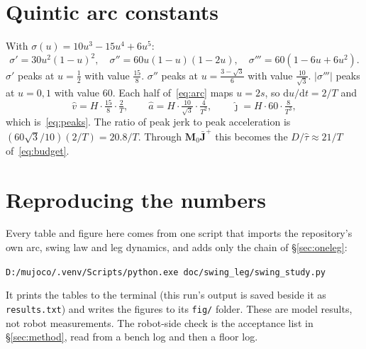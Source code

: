 \documentclass[11pt,a4paper]{article}
\newcommand{\Jbar}{\bar{\mathbf{J}}}
\newcommand{\Mmat}{\mathbf{M}}
\begin{document}
\appendix
\section{Quintic arc constants}
\label{app:quintic}

With $\sigma(u) = 10u^3 - 15u^4 + 6u^5$:
\[
\sigma' = 30u^2(1-u)^2, \quad \sigma'' = 60u(1-u)(1-2u), \quad \sigma''' = 60(1 - 6u + 6u^2).
\]
$\sigma'$ peaks at $u=\tfrac12$ with value $\tfrac{15}{8}$. $\sigma''$ peaks
at $u = \tfrac{3-\sqrt3}{6}$ with value $\tfrac{10}{\sqrt3}$. $|\sigma'''|$
peaks at $u = 0, 1$ with value 60. Each half of~\eqref{eq:arc} maps
$u = 2s$, so $\mathrm{d}u/\mathrm{d}t = 2/T$ and
\[
\hat v = H\cdot\tfrac{15}{8}\cdot\tfrac{2}{T}, \qquad
\hat a = H\cdot\tfrac{10}{\sqrt3}\cdot\tfrac{4}{T^2}, \qquad
\hat\jmath = H\cdot 60\cdot\tfrac{8}{T^3},
\]
which is~\eqref{eq:peaks}. The ratio of peak jerk to peak acceleration is
$(60\sqrt3/10)(2/T) = 20.8/T$. Through $\Mmat_0\Jbar^+$ this becomes the
$D/\hat\tau \approx 21/T$ of~\eqref{eq:budget}.

\section{Reproducing the numbers}

Every table and figure here comes from one script that imports the
repository's own arc, swing law and leg dynamics, and adds only the chain of
\S\ref{sec:oneleg}:
\begin{center}
\small\texttt{D:/mujoco/.venv/Scripts/python.exe doc/swing\_leg/swing\_study.py}
\end{center}
It prints the tables to the terminal (this run's output is saved beside it as
\texttt{results.txt}) and writes the figures to its \texttt{fig/} folder.
These are model results, not robot measurements. The robot-side check is the acceptance list in
\S\ref{sec:method}, read from a bench log and then a floor log.
\end{document}
